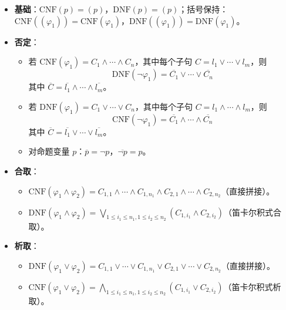 \documentclass[UTF8,11pt,a4paper]{ctexbook}   %
\theoremstyle{definition}
\begin{document}
\begin{itemize}
    \item \textbf{基础}：$\text{CNF}(p) = (p)$，$\text{DNF}(p) = (p)$；括号保持：$\text{CNF}((\varphi_1)) = \text{CNF}(\varphi_1)$，$\text{DNF}((\varphi_1)) = \text{DNF}(\varphi_1)$。
    
    \item \textbf{否定}：
    \begin{itemize}
        \item 若 $\text{CNF}(\varphi_1) = C_1 \land \cdots \land C_n$，其中每个子句 $C = l_1 \lor \cdots \lor l_m$，则
        \[
        \text{DNF}(\neg\varphi_1) = \overline{C_1} \lor \cdots \lor \overline{C_n}
        \]
        其中 $\overline{C} = \overline{l_1} \land \cdots \land \overline{l_m}$。
        \item 若 $\text{DNF}(\varphi_1) = C_1 \lor \cdots \lor C_n$，其中每个子句 $C = l_1 \land \cdots \land l_m$，则
        \[
        \text{CNF}(\neg\varphi_1) = \overline{C_1} \land \cdots \land \overline{C_n}
        \]
        其中 $\overline{C} = \overline{l_1} \lor \cdots \lor \overline{l_m}$。
        \item 对命题变量 $p$：$\overline{p} = \neg p$，$\overline{\neg p} = p$。
    \end{itemize}
    
    \item \textbf{合取}：
    \begin{itemize}
        \item $\text{CNF}(\varphi_1 \land \varphi_2) = C_{1,1} \land \cdots \land C_{1,n_1} \land C_{2,1} \land \cdots \land C_{2,n_2}$（直接拼接）。
        \item $\text{DNF}(\varphi_1 \land \varphi_2) = \bigvee_{1 \leq i_1 \leq n_1, 1 \leq i_2 \leq n_2} (C_{1,i_1} \land C_{2,i_2})$（笛卡尔积式合取）。
    \end{itemize}
    
    \item \textbf{析取}：
    \begin{itemize}
        \item $\text{DNF}(\varphi_1 \lor \varphi_2) = C_{1,1} \lor \cdots \lor C_{1,n_1} \lor C_{2,1} \lor \cdots \lor C_{2,n_2}$（直接拼接）。
        \item $\text{CNF}(\varphi_1 \lor \varphi_2) = \bigwedge_{1 \leq i_1 \leq n_1, 1 \leq i_2 \leq n_2} (C_{1,i_1} \lor C_{2,i_2})$（笛卡尔积式析取）。
    \end{itemize}
\end{itemize}
\end{document}
